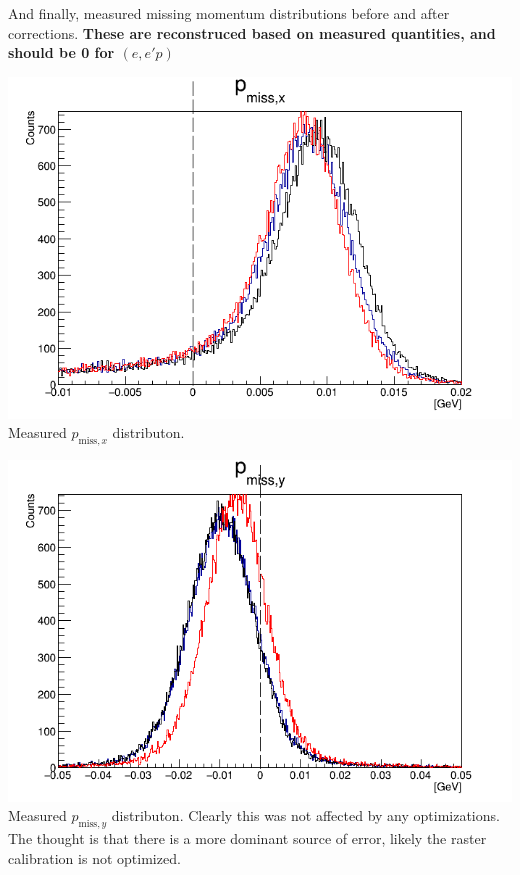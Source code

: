 \documentclass{article}
\begin{document}
And finally, measured missing momentum distributions before and after corrections. \textbf{These are reconstruced based on measured quantities, and should be 0 for $(e,e'p)$}
\begin{center}
\includegraphics[width=14cm]{Pmx.png}\\
Measured $p_{\textrm{miss},x}$ distributon.
\end{center}

\begin{center}
\includegraphics[width=14cm]{Pmy.png}\\
Measured $p_{\textrm{miss},y}$ distributon. Clearly this was not affected by any optimizations. The thought is that there is a more dominant source of error, likely the raster calibration is not optimized.
\end{center}
\end{document}
